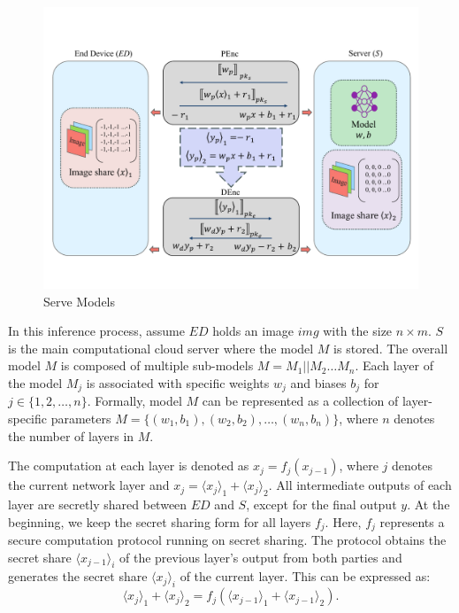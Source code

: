 \documentclass[conference]{IEEEtran}
\begin{document}
\begin{figure}[ht]
\centering
\includegraphics[scale=0.6]{fig3.pdf}
\caption{Serve Models} \label{fig:Serve_Models}
\end{figure}
In this inference process, assume $ED$ holds an image $img$ with the size $n\times m$. $S$ is the main computational cloud server where the model $M$ is stored. The overall model $M$ is composed of multiple sub-models $M=M_1 || M_2 \dots M_n$. Each layer of the model $M_j$ is associated with specific weights $w_{j}$ and biases $b_{j}$ for $j \in \{1, 2, \dots, n\}$.
Formally, model $M$ can be represented as a collection of layer-specific parameters $M=\{(w_{1},b_{1}),(w_{2},b_{2}),\dots,(w_{n},b_{n})\}$, where $n$ denotes the number of layers in $M$.

The computation at each layer is denoted as $x_j = f_j(x_{j-1})$, where $j$ denotes the current network layer and $x_j=\langle x_j \rangle_1 + \langle x_j \rangle_2$. All intermediate outputs of each layer are secretly shared between $ED$ and $S$, except for the final output $y$. At the beginning, we keep the secret sharing form for all layers $f_j$. Here, $f_j$ represents a secure computation protocol running on secret sharing. The protocol obtains the secret share $\langle x_{j-1} \rangle_i$ of the previous layer's output from both parties and generates the secret share $\langle x_j \rangle_i$ of the current layer. This can be expressed as:
\begin{equation}
    \langle x_j \rangle_1+\langle x_j \rangle_2 = f_j(\langle x_{j-1} \rangle_1 + \langle x_{j-1} \rangle_2).
\end{equation}
\end{document}
